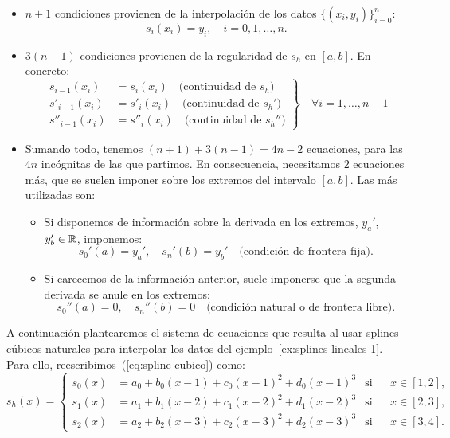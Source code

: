  \begin{itemize}
 \item $n+1$ condiciones provienen de la interpolación de los datos
   $\{(x_i, y_i)\}_{i=0}^n$:
   $$
   s_i(x_i)=y_i, \quad i=0,1,\dots,n.
   $$
 \item $3(n-1)$ condiciones provienen  de la regularidad de $s_h$ en
   $[a,b]$. En concreto:
   \begin{equation*}
     \left.
       \begin{aligned}
         s_{i-1}(x_i)&=s_{i}(x_i) \quad \text{(continuidad de $s_h$)}
         \\
         s'_{i-1}(x_i)&=s'_{i}(x_i) \quad \text{(continuidad de $s_h'$)}
         \\
         s''_{i-1}(x_i)&=s''_{i}(x_i) \quad \text{(continuidad de $s_h''$)}
       \end{aligned}
     \right\} \quad \forall i=1,\dots,n-1 
   \end{equation*}
 \item Sumando todo, tenemos $(n+1) + 3(n-1) = 4n-2$ ecuaciones, para
   las $4n$ incógnitas de las que partimos. En consecuencia,
   necesitamos $2$ ecuaciones más, que se suelen imponer sobre los
   extremos del intervalo $[a,b]$. Las más utilizadas son:
   \begin{itemize}
   \item Si disponemos de información sobre la derivada en los
     extremos, $y_a'$, $y_b'\in\operatorname{{\mathbb R}}$, imponemos:
     \begin{equation*}
       s_0'(a)=y_a', \quad s_n'(b)=y_b' \quad \text{(condición de frontera fija)}.
     \end{equation*}
   \item Si carecemos de la información anterior, suele imponerse que
     la segunda derivada se anule en los extremos:
     \begin{equation*}
       s_0''(a)=0, \quad s_n''(b)=0 \quad \text{(condición natural o de
         frontera libre)}.
     \end{equation*}
   \end{itemize}
 \end{itemize}

 \begin{example}
   \label{ex:splines-cubicos}
   A continuación plantearemos el sistema de ecuaciones que resulta al
   usar splines cúbicos naturales para
   interpolar los datos del ejemplo~\ref{ex:splines-lineales-1}. Para
   ello, reescribimos~(\ref{eq:spline-cubico}) como:
   \begin{equation*}
     s_h(x)=\left\{
       \begin{aligned}
         s_0(x)&=a_0 + b_0(x-1) + c_0(x-1)^2 + d_0(x-1)^3 
         & \text{si} && x\in[1,2],
         \\
         s_1(x)&=a_1 + b_1(x-2) + c_1(x-2)^2 + d_1(x-2)^3 
         &\text{si}&& x\in[2,3],
         \\
         s_2(x)&=a_2 + b_2(x-3) + c_2(x-3)^2 + d_2(x-3)^3 
         & \text{si}&& x\in[3,4].
       \end{aligned}\right.
   \end{equation*}
 \end{example}

